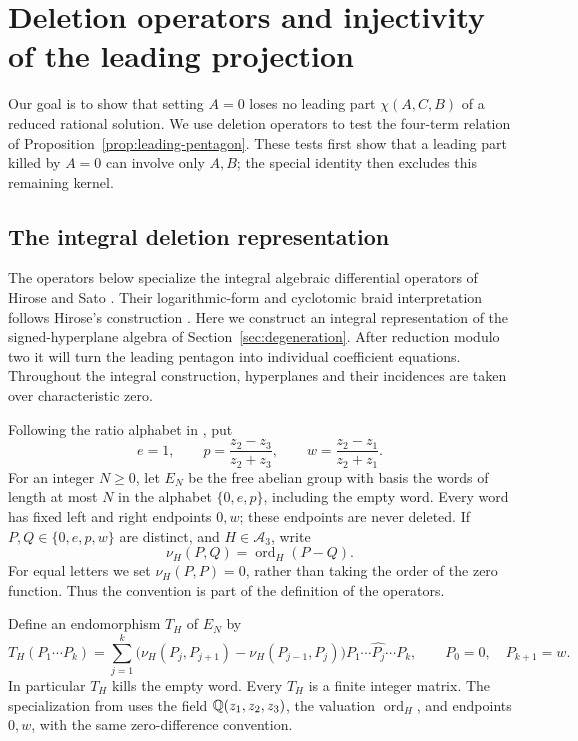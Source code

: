 \section{Deletion operators and injectivity of the leading projection}
\label{sec:deletion}

Our goal is to show that setting $A=0$ loses no leading part
$\chi(A,C,B)$ of a reduced rational solution.  We use deletion
operators to test the four-term relation of
Proposition~\ref{prop:leading-pentagon}.  These tests first show that
a leading part killed by $A=0$ can involve only $A,B$; the special
identity then excludes this remaining kernel.

\subsection{The integral deletion representation}
The operators below specialize the integral algebraic differential
operators of Hirose and Sato \cite[Section~2]{HiroseSato}.
Their logarithmic-form and cyclotomic braid interpretation follows
Hirose's construction \cite[Section~4.3]{Hirose}.
Here we construct an integral representation of the signed-hyperplane
algebra of Section~\ref{sec:degeneration}.  After reduction modulo two it
will turn the leading pentagon into individual coefficient equations.
Throughout the integral construction, hyperplanes and their incidences
are taken over characteristic zero.

Following the ratio alphabet in \cite[Section~6]{Hirose}, put
\begin{equation}\label{eq:deletion-letters}
 e=1,\qquad
 p=\frac{z_2-z_3}{z_2+z_3},\qquad
 w=\frac{z_2-z_1}{z_2+z_1}.
\end{equation}
For an integer $N\geq0$, let $E_N$ be the free abelian group with basis the
words of length at most $N$ in the alphabet $\{0,e,p\}$, including the
empty word.  Every word has fixed left and right endpoints $0,w$; these
endpoints are never deleted.  If $P,Q\in\{0,e,p,w\}$ are distinct, and
$H\in\mathcal A_3$, write
\[
 \nu_H(P,Q)=\operatorname{ord}_H(P-Q).
\]
For equal letters we set $\nu_H(P,P)=0$, rather than taking the order of
the zero function.  Thus the convention is part of the definition of
the operators.

Define an endomorphism $T_H$ of $E_N$ by
\begin{equation}\label{eq:deletion-operator}
 T_H(P_1\cdots P_k)
 =\sum_{j=1}^{k}
 \bigl(\nu_H(P_j,P_{j+1})-\nu_H(P_{j-1},P_j)\bigr)
 P_1\cdots\widehat{P_j}\cdots P_k,
 \qquad P_0=0,\quad P_{k+1}=w.
\end{equation}
In particular $T_H$ kills the empty word.  Every $T_H$ is a finite
integer matrix.  The specialization from \cite[Section~2]{HiroseSato}
uses the field $\mathbb Q(z_1,z_2,z_3)$, the valuation $\operatorname{ord}_H$,
and endpoints $0,w$, with the same zero-difference convention.

